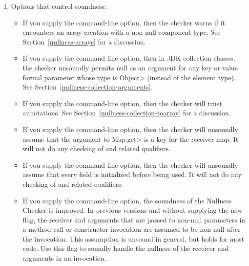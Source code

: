 \begin{enumerate}
\item
  Options that control soundness:

\begin{itemize}
\item
  \label{nullness-lint-soundArrayCreationNullness}%
  \label{nullness-lint-nonnullarraycomponents}%
  If you supply the  command-line
  option, then the checker warns if it encounters an array creation
  with a non-null component type.
  See Section~\ref{nullness-arrays} for a discussion.

\item
  \label{collection-object-parameters-may-be-null}
  If you supply the
  command-line option, then in JDK collection classes, the checker
  unsoundly permits null as an argument for any key or value formal
  parameter whose type is \<Object> (instead of the element type).
  See Section~\ref{nullness-collection-arguments}.

\item
  \label{nullness-lint-trustarraylenzero}%
  If you supply the  command-line option, then
  the checker will trust 
  annotations. See Section~\ref{nullness-collection-toarray} for a discussion.

\item
  \label{nullness-assumeKeyFor}%
  If you supply the  command-line option, then the
  checker will unsoundly assume that the argument to \<Map.get> is a key
  for the receiver map.  It will not do any checking of
   and related qualifiers.

\item
  \label{nullness-assumeInitialized}%
  If you supply the  command-line option, then the
  checker will unsoundly assume that every field is initialized before
  being used. It will not do any checking of
   and related qualifiers.

\item
  \label{nullness-conservativeArgumentNullnessAfterInvocation}%
  \label{nullness-invocationPreservesArgumentNullness}%
  If you supply the  command-line option, the soundness of
  the Nullness Checker is improved. In previous versions and without supplying the new flag, the receiver and
  arguments that are passed to non-null parameters in a method call or constructor invocation are assumed to
  be non-null after the invocation.
  This assumption is unsound in general, but holds for most code.
  Use this flag to soundly handle the nullness of the receiver and arguments in an invocation.


\end{itemize}
\end{enumerate}
